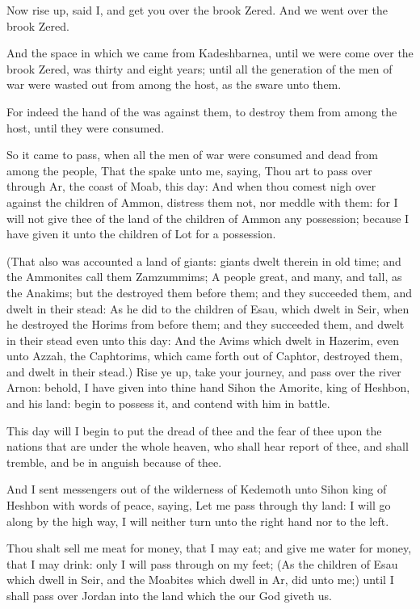 \verse Now rise up, said I, and get you over the brook Zered. And we went over the brook Zered.

\verse And the space in which we came from Kadeshbarnea, until we were come over the brook Zered, was thirty and eight years; until all the generation of the men of war were wasted out from among the host, as the \LORD sware unto them.

\verse For indeed the hand of the \LORD was against them, to destroy them from among the host, until they were consumed.

\verse So it came to pass, when all the men of war were consumed and dead from among the people, \verse That the \LORD spake unto me, saying, \verse Thou art to pass over through Ar, the coast of Moab, this day: \verse And when thou comest nigh over against the children of Ammon, distress them not, nor meddle with them: for I will not give thee of the land of the children of Ammon any possession; because I have given it unto the children of Lot for a possession.

\verse (That also was accounted a land of giants: giants dwelt therein in old time; and the Ammonites call them Zamzummims; \verse A people great, and many, and tall, as the Anakims; but the \LORD destroyed them before them; and they succeeded them, and dwelt in their stead: \verse As he did to the children of Esau, which dwelt in Seir, when he destroyed the Horims from before them; and they succeeded them, and dwelt in their stead even unto this day: \verse And the Avims which dwelt in Hazerim, even unto Azzah, the Caphtorims, which came forth out of Caphtor, destroyed them, and dwelt in their stead.)  \verse Rise ye up, take your journey, and pass over the river Arnon: behold, I have given into thine hand Sihon the Amorite, king of Heshbon, and his land: begin to possess it, and contend with him in battle.

\verse This day will I begin to put the dread of thee and the fear of thee upon the nations that are under the whole heaven, who shall hear report of thee, and shall tremble, and be in anguish because of thee.

\verse And I sent messengers out of the wilderness of Kedemoth unto Sihon king of Heshbon with words of peace, saying, \verse Let me pass through thy land: I will go along by the high way, I will neither turn unto the right hand nor to the left.

\verse Thou shalt sell me meat for money, that I may eat; and give me water for money, that I may drink: only I will pass through on my feet; \verse (As the children of Esau which dwell in Seir, and the Moabites which dwell in Ar, did unto me;) until I shall pass over Jordan into the land which the \LORD our God giveth us.

